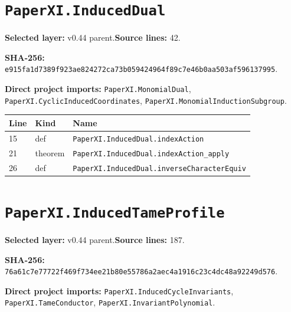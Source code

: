 \documentclass[10pt,oneside]{book}
\begin{document}
\section{\texorpdfstring{\nolinkurl{PaperXI.InducedDual}}{PaperXI.InducedDual}}\label{module:PaperXI.InducedDual}

\textbf{Selected layer:} v0.44 parent.\quad\textbf{Source lines:} 42.\par\textbf{SHA-256:} {\scriptsize\nolinkurl{e915fa1d7389f923ae824272ca73b059424964f89c7e46b0aa503af596137995}}.


\textbf{Direct project imports:} \nolinkurl{PaperXI.MonomialDual}, \nolinkurl{PaperXI.CyclicInducedCoordinates}, \nolinkurl{PaperXI.MonomialInductionSubgroup}.

\begin{longtable}{@{}p{}p{}p{}@{}}\toprule Line&Kind&Name\\\midrule\endhead

15&def&\nolinkurl{PaperXI.InducedDual.indexAction}\\

21&theorem&\nolinkurl{PaperXI.InducedDual.indexAction_apply}\\

26&def&\nolinkurl{PaperXI.InducedDual.inverseCharacterEquiv}\\

\bottomrule\end{longtable}

\section{\texorpdfstring{\nolinkurl{PaperXI.InducedTameProfile}}{PaperXI.InducedTameProfile}}\label{module:PaperXI.InducedTameProfile}

\textbf{Selected layer:} v0.44 parent.\quad\textbf{Source lines:} 187.\par\textbf{SHA-256:} {\scriptsize\nolinkurl{76a61c7e77722f469f734ee21b80e55786a2aec4a1916c23c4dc48a92249d576}}.


\textbf{Direct project imports:} \nolinkurl{PaperXI.InducedCycleInvariants}, \nolinkurl{PaperXI.TameConductor}, \nolinkurl{PaperXI.InvariantPolynomial}.
\end{document}
